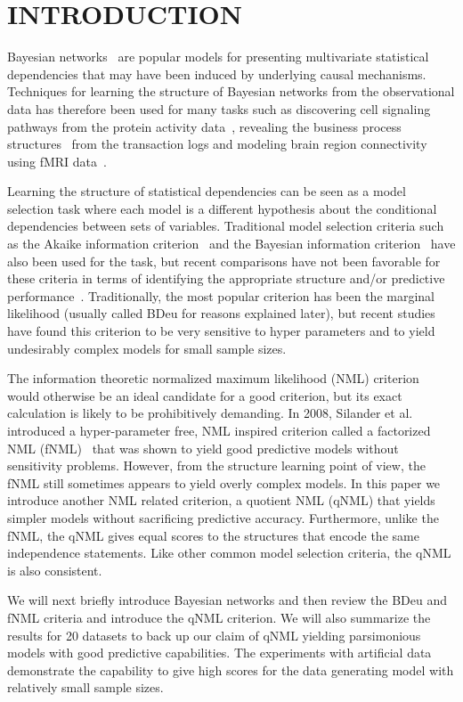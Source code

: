 \section{INTRODUCTION}
\label{sec:intro}
Bayesian networks~\cite{Pear88} are popular models for presenting
multivariate statistical dependencies that may have been induced by
underlying causal mechanisms.  Techniques for learning the structure
of Bayesian networks from the observational data has therefore been
used for many tasks such as discovering cell signaling pathways from
the protein activity data~\cite{bn4sigpath02}, revealing the business
process structures~\cite{bn4bpmining} from the transaction logs and
modeling brain region connectivity using fMRI
data~\cite{bn4brainconnect}.

Learning the structure of statistical dependencies can be seen as a
model selection task where each model is a different hypothesis about
the conditional dependencies between sets of variables. Traditional
model selection criteria such as the Akaike information
criterion~\cite{Akai73} and the Bayesian information
criterion~\cite{Schw78} have also been used for the task, but recent
comparisons have not been favorable for these criteria in terms of
identifying the appropriate structure and/or predictive
performance~\cite{cosco.pgm08a}. Traditionally, the most popular
criterion has been the marginal likelihood (usually called BDeu for
reasons explained later), but recent studies~\cite{cosco.uai07,Steck08}
have found this criterion to be very sensitive to hyper parameters
and to yield undesirably complex models for small sample sizes.

The information theoretic normalized maximum likelihood (NML)
criterion~\cite{Shta87,Riss96a} would otherwise be an ideal candidate
for a good criterion,  but its exact calculation is likely to be
prohibitively demanding. In 2008, Silander et al. introduced a
hyper-parameter free, NML inspired criterion called a factorized NML
(fNML)~\cite{cosco.pgm08a} that was shown to yield good predictive
models without sensitivity problems.  However, from the structure
learning point of view, the fNML still sometimes appears to yield
overly complex models. In this paper we introduce another NML related
criterion, a quotient NML (qNML) that yields simpler models without
sacrificing predictive accuracy. Furthermore, unlike the fNML, the
qNML gives equal scores to the structures that encode the same
independence statements. Like other common model selection criteria,
the qNML is also consistent.

We will next briefly introduce Bayesian networks and then review the
BDeu and fNML criteria and introduce the qNML criterion.  We will also
summarize the results for 20 datasets to back up our claim of qNML
yielding parsimonious models with good predictive capabilities. The
experiments with artificial data demonstrate the capability to give
high scores for the data generating model with relatively small sample
sizes.

